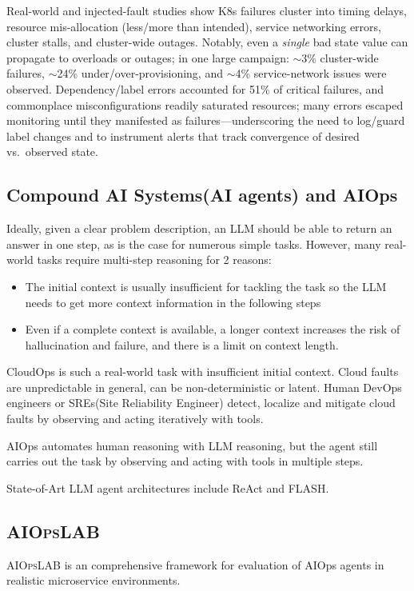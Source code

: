 \documentclass[conference]{IEEEtran}
\begin{document}
Real-world and injected-fault studies \cite{10646977} show K8s failures cluster into timing delays, resource mis-allocation (less/more than intended), service networking errors, cluster stalls, and cluster-wide outages. Notably, even a \emph{single} bad state value can propagate to overloads or outages; in one large campaign: $\sim$3\% cluster-wide failures, $\sim$24\% under/over-provisioning, and $\sim$4\% service-network issues were observed. Dependency/label errors accounted for 51\% of critical failures, and commonplace misconfigurations readily saturated resources; many errors escaped monitoring until they manifested as failures—underscoring the need to log/guard label changes and to instrument alerts that track convergence of desired vs.\ observed state.


\subsection{Compound AI Systems(AI agents) and AIOps}
Ideally, given a clear problem description, an LLM should be able to return an answer in one step, as is the case for numerous simple tasks. However, many real-world tasks require multi-step reasoning for 2 reasons: 
        \begin{itemize}
                \item The initial context is usually insufficient for tackling the task so the LLM needs to get more context information in the following steps  
                \item Even if a complete context is available, a longer context increases the risk of hallucination and failure, and there is a limit on context length.
        \end{itemize}

        CloudOps is such a real-world task with insufficient initial context. Cloud faults are unpredictable in general, can be non-deterministic or latent. Human DevOps engineers or SREs(Site Reliability Engineer) detect, localize and mitigate cloud faults by observing and acting iteratively with tools. 

        AIOps automates human reasoning with LLM reasoning, but the agent still carries out the task by observing and acting with tools in multiple steps.     

        State-of-Art LLM agent architectures include ReAct\cite{yao2023reactsynergizingreasoningacting} and FLASH\cite{zhang2024flash}.

\subsection{\textsc{AIOps}LAB}
\textsc{AIOps}LAB\cite{chen2025aiopslab} is an comprehensive framework for evaluation of AIOps agents in realistic microservice environments.  
\end{document}
